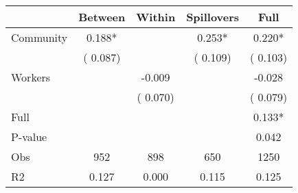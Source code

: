 
\begin{tabular}{l*{4}{c}}\hline&\multicolumn{1}{c}{Between}&\multicolumn{1}{c}{Within}&\multicolumn{1}{c}{Spillovers}&\multicolumn{1}{c}{Full}\\ \hline
 Community             &              0.188*      &                                               &        0.253* &         0.220*                            \\ 
                               &        (       0.087)           &                                       &       (       0.109)     &      (       0.103)                                           \\ 
 Workers       &                                               &       -0.009    &                                &            -0.028                            \\ 
                               &                                               & (       0.070)                  &                                        &      (       0.079)                                           \\ 
\hline                                                                                                                                                                                                                                            
 Full                  &                                               &                                               &                                        &             0.133*                                     \\ 
 P-value               &                                               &                                               &                                        &             0.042                                           \\ 
 Obs                   &               952               &       898                       &       650                &              1250                                               \\ 
 R2                    &                      0.127              &              0.000                      &              0.115               &                     0.125                                              \\ 
\hline \end{tabular}                                                                                                                                                                                                              